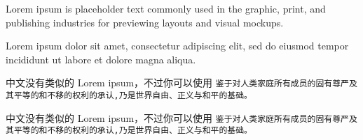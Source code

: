 \documentclass[11pt]{ctexart}
\begin{document}
Lorem ipsum is placeholder text commonly used in the graphic, print, and publishing industries for previewing layouts and visual mockups.
\begin{verbatim*}Lorem ipsum dolor sit amet, consectetur adipiscing elit, sed do eiusmod tempor incididunt ut labore et dolore magna aliqua.\end{verbatim*}


中文没有类似的 Lorem ipsum，不过你可以使用 \texttt{鉴于对人类家庭所有成员的固有尊严及其平等的和不移的权利的承认,乃是世界自由、正义与和平的基础。}

中文没有类似的 Lorem ipsum，不过你可以使用 \texttt{鉴于对人类家庭所有成员的固有尊严及其平等的和不移的权利的承认,乃是世界自由、正义与和平的基础。}
\end{document}

